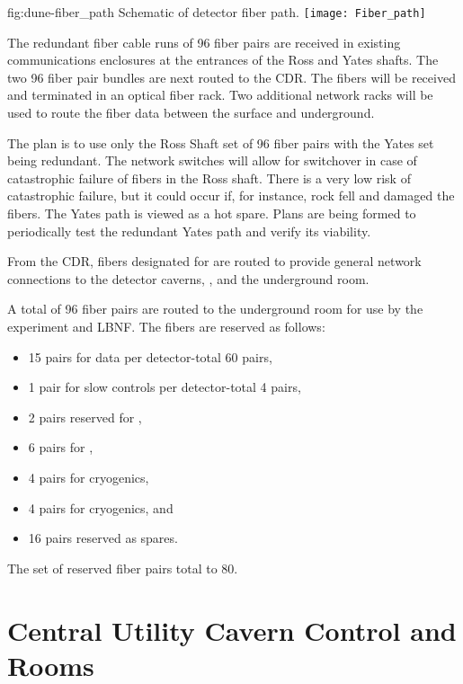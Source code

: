 \begin{dunefigure}{fig:dune-fiber_path}
  {Schematic of detector fiber path.}
  \texttt{[image: Fiber\_path]}
\end{dunefigure}

The redundant fiber cable runs of 96 fiber pairs are received in
existing communications enclosures at the  entrances of the Ross
and Yates shafts.  The two 96 fiber pair bundles are next routed to
the CDR.  The fibers will be received and terminated in an optical
fiber rack. Two additional network racks will be used to route the
fiber data between the surface and underground.

The plan is to use only the Ross Shaft set of 96 fiber pairs with the
Yates set being redundant.  The network switches will allow for
switchover in case of catastrophic failure of fibers in the Ross
shaft. %
There is a very low risk of catastrophic failure, but it could occur
if, for instance, rock fell and damaged the fibers.  The Yates path is
viewed as a hot spare. Plans are being formed to periodically test
the redundant Yates path and verify its viability.

From the CDR, fibers designated for  are routed to provide
general network connections to the detector caverns,  , and the underground  room.

A total of 96 fiber pairs are routed to the underground  room for
use by the  experiment and LBNF. The fibers are reserved as
follows:
\begin{itemize}
  \item 15 pairs for  data per detector-total 60 pairs,
\item 1 pair for slow controls per detector-total 4 pairs,
\item 2 pairs reserved for ,
\item 6 pairs for ,
\item 4 pairs for  cryogenics,
\item 4 pairs for  cryogenics, and
  \item 16 pairs reserved as spares.
\end{itemize}
The set of reserved fiber pairs total to 80.



\section{Central Utility Cavern Control and  Rooms}
\label{sec:fdsp-coord-cuc-daq}

